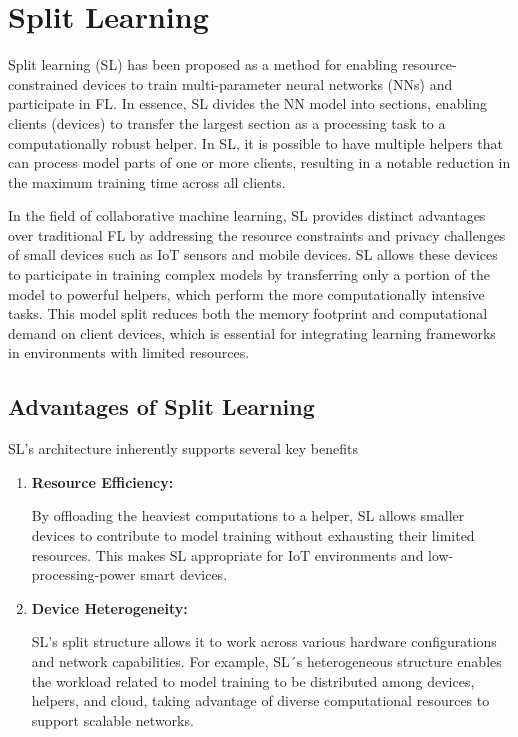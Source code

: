 \section{Split Learning}
\label{sec:split_learning}

Split learning (SL) has been proposed as a method for enabling resource-constrained devices to train multi-parameter neural networks (NNs) and participate in \gls{FL}. In essence, \gls{SL} divides the \gls{NN} model into sections, enabling clients (devices) to transfer the largest section as a processing task to a computationally robust helper. In SL, it is possible to have multiple helpers that can process model parts of one or more clients, resulting in a notable reduction in the maximum training time across all clients.

In the field of collaborative machine learning, \gls{SL} provides distinct advantages over traditional \gls{FL} by addressing the resource constraints and privacy challenges of small devices such as IoT sensors and mobile devices. SL allows these devices to participate in training complex models by transferring only a portion of the model to powerful helpers, which perform the more computationally intensive tasks. This model split reduces both the memory footprint and computational demand on client devices, which is essential for integrating learning frameworks in environments with limited resources.

\subsection{Advantages of Split Learning}
\label{sec:advantages_of_sl}

SL’s architecture inherently supports several key benefits

\begin{enumerate}
	\item \textbf{Resource Efficiency:} 
	
	By offloading the heaviest computations to a helper, \gls{SL} allows smaller devices to contribute to model training without exhausting their limited resources. This makes SL appropriate for IoT environments and low-processing-power smart devices.
	
	\item \textbf{Device Heterogeneity:} 
	
	SL’s split structure allows it to work across various hardware configurations and network capabilities. For example, SL´s heterogeneous structure enables the workload related to model training to be distributed among devices, helpers, and cloud, taking advantage of diverse computational resources to support scalable networks.
\end{enumerate}

